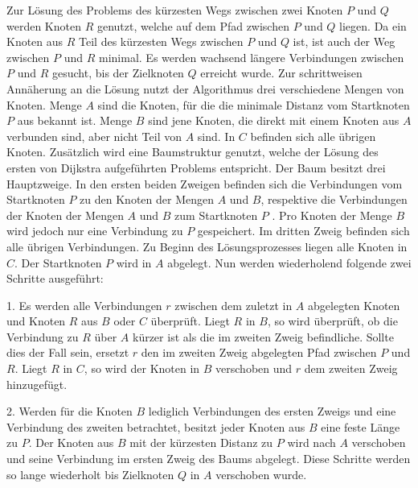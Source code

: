 Zur Lösung des Problems des kürzesten Wegs zwischen zwei Knoten $P$ und $Q$ 
werden Knoten $R$ %
genutzt, welche auf dem Pfad zwischen $P$ und $Q$ liegen. Da ein Knoten %
aus $R$ Teil des kürzesten Wegs zwischen $P$ und $Q$ ist, ist auch der Weg zwischen $P$ und $R$ minimal. Es werden wachsend längere Verbindungen zwischen $P$ und $R$ gesucht, bis der Zielknoten $Q$ erreicht wurde. %
Zur schrittweisen Annäherung an die Lösung nutzt der Algorithmus drei %
verschiedene Mengen von Knoten. Menge $A$ sind die Knoten, für die die minimale Distanz vom Startknoten $P$ aus bekannt ist. Menge $B$ sind jene Knoten, die direkt mit einem Knoten aus $A$ verbunden sind, aber nicht Teil von $A$ sind. In $C$ befinden sich alle übrigen Knoten. %
Zusätzlich wird eine Baumstruktur genutzt, welche der Lösung des ersten von Dijkstra aufgeführten Problems entspricht. %
Der Baum besitzt drei Hauptzweige. In den ersten beiden Zweigen befinden sich die Verbindungen vom Startknoten $P$ zu den Knoten der Mengen $A$ und $B$, respektive die Verbindungen der Knoten der Mengen $A$ und $B$ zum Startknoten $P$ . Pro Knoten der Menge $B$ wird jedoch nur eine Verbindung zu $P$ gespeichert. Im dritten Zweig befinden sich alle übrigen Verbindungen. 
Zu Beginn des Lösungsprozesses liegen alle Knoten in $C$. Der Startknoten $P$ wird in $A$ abgelegt. Nun werden wiederholend folgende zwei Schritte ausgeführt:


1.	Es werden alle Verbindungen $r$ zwischen dem zuletzt in $A$ abgelegten Knoten und Knoten $R$ aus $B$ oder $C$ überprüft. Liegt $R$ in $B$, so wird überprüft, ob die Verbindung zu $R$ über $A$ kürzer ist als die im zweiten Zweig befindliche. Sollte dies der Fall sein, ersetzt $r$ den im zweiten Zweig abgelegten Pfad zwischen $P$ und $R$. Liegt $R$ in $C$, so wird der Knoten in $B$ verschoben und $r$ dem zweiten Zweig hinzugefügt.


2.	Werden für die Knoten $B$ lediglich Verbindungen des ersten Zweigs und eine Verbindung des zweiten betrachtet, besitzt jeder Knoten aus $B$ eine feste Länge zu $P$. Der Knoten aus $B$ mit der kürzesten Distanz zu $P$ wird nach $A$ verschoben und seine Verbindung im ersten Zweig des Baums abgelegt.
Diese Schritte werden so lange wiederholt bis Zielknoten $Q$ in $A$ verschoben wurde.

